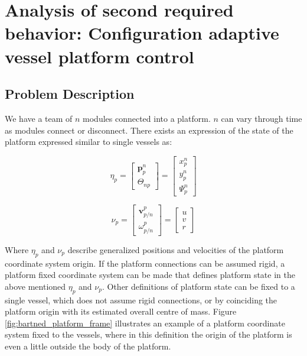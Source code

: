 \section{Analysis of second required behavior: Configuration adaptive vessel platform control}
\label{analysisConfigAdaptation}

\subsection{Problem Description}
We have a team of $n$ modules connected into a platform. $n$ can vary through time as modules connect or disconnect. 
There exists an expression of the state of the platform expressed similar to single vessels as:

\begin{equation}
\eta_p = \begin{bmatrix} \textbf{p}^{n}_{p} \\[8pt]  \Theta_{np} \end{bmatrix} = \begin{bmatrix} x^{n}_{p} \\[8pt]  y^{n}_{p} \\[8pt] \Psi^n_p \end{bmatrix}
\end{equation}

\begin{equation}
\nu_p = \begin{bmatrix} \textbf{v}^{p}_{p/n} \\[8pt]  \omega^{p}_{p/n} \end{bmatrix} = \begin{bmatrix} u\\v\\r \end{bmatrix}
\end{equation}

Where $\eta_p$ and $\nu_p$ describe generalized positions and velocities of the platform coordinate system origin.  If the platform connections can be assumed rigid, a platform fixed coordinate system can be made that defines platform state in the above mentioned $\eta_p$ and $\nu_p$. Other definitions of platform state can be fixed to a single vessel, which does not assume rigid connections, or by coinciding the platform origin with its estimated overall centre of mass. Figure \ref{fig:bartned_platform_frame} illustrates an example of a platform coordinate system fixed to the vessels, where in this definition the origin of the platform is even a little outside the body of the platform. 

